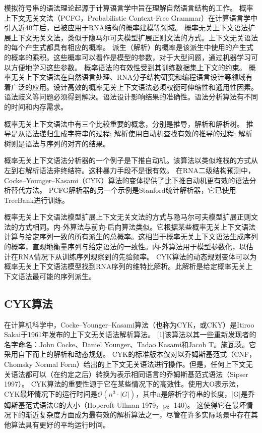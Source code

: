 模拟符号串的语法理论起源于计算语言学中旨在理解自然语言结构的工作\cite{chomsky1956three,chomsky1959certain,lees1957syntactic}。
概率上下文无关文法（PCFG，Probabilistic Context-Free Grammar）在计算语言学中引入近40年后，已被应用于RNA结构的概率建模等领域\cite{sakakibara1994stochastic}。
概率无关上下文语法扩展上下文无关文法，类似于隐马尔可夫模型扩展正则文法的方式。上下文无关语法的每个产生式都具有相应的概率。
派生（解析）的概率是该派生中使用的产生式的概率的乘积。这些概率可以看作是模型的参数，对于大型问题，通过机器学习可以方便地学习这些参数。
概率语法的有效性受到其训练数据集上下文的约束。
概率无关上下文语法在自然语言处理、RNA分子结构研究和编程语言设计等领域有着广泛的应用。设计高效的概率无关上下文语法必须权衡可伸缩性和通用性因素。
语法歧义等问题必须得到解决。语法设计影响结果的准确性。语法分析算法有不同的时间和内存需求。

概率无关上下文语法中有三个比较重要的概念，分别是推导，解析和解析树。
推导是从语法递归生成字符串的过程; 解析使用自动机查找有效的推导的过程; 解析树则是语法与序列的对齐的结果。

概率无关上下文语法分析器的一个例子是下推自动机\cite{sippl1999biological}。该算法以类似堆栈的方式从左到右解析语法非终结符。这种暴力手段不是很有效。
在RNA二级结构预测中，Cocke–Younger–Kasami（CYK）算法的变体提供了比下推自动机更有效的语法分析替代方法。
PCFG解析器的另一个示例是Stanford统计解析器\cite{klein2003accurate}，它已使用TreeBank进行训练。

概率无关上下文语法模型扩展上下文无关文法的方式与隐马尔可夫模型扩展正则文法的方式相同。内-外算法与前向-后向算法类似。它根据某些概率无关上下文语法计算与给定序列一致的所有派生的总概率。这相当于概率无关上下文语法生成序列的概率，直观地衡量序列与给定语法的一致性。内-外算法用于模型参数化，以估计在RNA情况下从训练序列观察到的先验频率。
CYK算法的动态规划变体可以为概率无关上下文语法模型找到RNA序列的维特比解析。此解析是给定概率无关上下文语法最可能的序列派生。

\subsection{CYK算法}

在计算机科学中，Cocke–Younger–Kasami算法（也称为CYK，或CKY）是Itiroo Sakai\cite{mey1965international}于1961年发布的上下文无关语法解析算法。
[1]该算法以其一些重新发现者的名字命名：John Cocke、Daniel Younger、Tadao Kasami和Jacob T。施瓦茨。它采用自下而上的解析和动态规划。
CYK的标准版本仅对以乔姆斯基范式（CNF，Chomsky Normal Form）给出的上下文无关语法进行操作。但是，任何上下文无关语法都可以（在约定之后）转换为表示相同语言的乔姆斯基范式语法（Sipser 1997）。
CYK算法的重要性源于它在某些情况下的高效性。使用大O表示法，CYK最坏情况下的运行时间是$\displaystyle \mathcal{O} (n^{3} \cdot |G|)$，其中n是解析字符串的长度，|G|是乔姆斯基范式语法G的大小（Hopcroft Ullman 1979，p。140)。
这使得它在最坏情况下的渐近复杂度方面成为最有效的解析算法之一，尽管在许多实际场景中存在其他算法具有更好的平均运行时间\cite{sipser1997context}。

